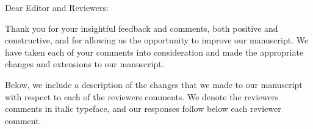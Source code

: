 \documentclass[8pt]{letter} %
\begin{document}
\let\raggedleft\raggedright                %

\newcommand{\response}[1]{{\bf Response.} #1}

\newcommand{\comment}[2]{
  \stepcounter{commentCounter}
  \vspace{2em}
  {\bf Comment R#1.\arabic{commentCounter}.} {\em #2}
  }
 
\begin{letter}{}

\address{
	Muhammad Moiz Arif\\
	EV 3.274, 1515 Saint-Catherine Street West\\
	Department of Computer Science and Software Engineering, Concordia University\\ 
	Montreal, QC, Canada H3G 2W1 \\
}



\opening{Dear Editor and Reviewers:} 
 
\noindent Thank you for your insightful feedback and comments, both positive and constructive, and for allowing us the opportunity to improve our manuscript. We have taken each of your comments into consideration and made the appropriate changes and extensions to our manuscript. 




Below, we include a description of the changes that we made to our manuscript with respect to each of the reviewers comments. We denote the reviewers comments in italic typeface, and our responses follow below each reviewer comment.





\end{letter}
\end{document}
